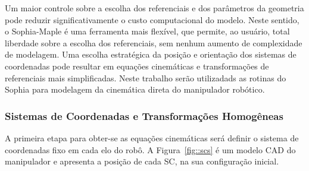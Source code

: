 Um maior controle sobre a escolha dos referenciais e dos parâmetros da geometria
pode reduzir significativamente o custo computacional do modelo.
Neste sentido, o Sophia-Maple é uma ferramenta mais flexível, que permite, ao
usuário, total liberdade sobre a escolha dos referenciais, sem nenhum aumento de
complexidade de modelagem. Uma escolha estratégica da posição e orientação dos
sistemas de coordenadas pode resultar em equações cinemáticas e transformações de
referenciais mais simplificadas. Neste trabalho serão utilizadads as rotinas do
Sophia para modelagem da cinemática direta do manipulador robótico.

\subsubsection{Sistemas de Coordenadas e Transformações Homogêneas}

A primeira etapa para obter-se as equações cinemáticas será definir o sistema de
coordenadas fixo em cada elo do robô. A Figura~\ref{fig::scs} é um modelo CAD do
manipulador e apresenta a posição de cada SC, na sua configuração inicial.

